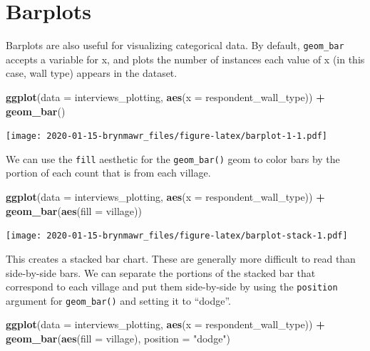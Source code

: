 \documentclass[]{book}
\newenvironment{Shaded}{\begin{snugshade}}{\end{snugshade}}
\newcommand{\KeywordTok}[1]{\textcolor[rgb]{0.13,0.29,0.53}{\textbf{#1}}}
\newcommand{\DataTypeTok}[1]{\textcolor[rgb]{0.13,0.29,0.53}{#1}}
\newcommand{\StringTok}[1]{\textcolor[rgb]{0.31,0.60,0.02}{#1}}
\newcommand{\OperatorTok}[1]{\textcolor[rgb]{0.81,0.36,0.00}{\textbf{#1}}}
\newcommand{\NormalTok}[1]{#1}
\begin{document}
\section{Barplots}\label{barplots}

Barplots are also useful for visualizing categorical data. By default,
\texttt{geom\_bar} accepts a variable for x, and plots the number of
instances each value of x (in this case, wall type) appears in the
dataset.

\begin{Shaded}
\begin{Highlighting}[]
\KeywordTok{ggplot}\NormalTok{(}\DataTypeTok{data =}\NormalTok{ interviews_plotting, }\KeywordTok{aes}\NormalTok{(}\DataTypeTok{x =}\NormalTok{ respondent_wall_type)) }\OperatorTok{+}
\StringTok{    }\KeywordTok{geom_bar}\NormalTok{()}
\end{Highlighting}
\end{Shaded}

\texttt{[image: 2020-01-15-brynmawr\_files/figure-latex/barplot-1-1.pdf]}

We can use the \texttt{fill} aesthetic for the \texttt{geom\_bar()} geom
to color bars by the portion of each count that is from each village.

\begin{Shaded}
\begin{Highlighting}[]
\KeywordTok{ggplot}\NormalTok{(}\DataTypeTok{data =}\NormalTok{ interviews_plotting, }\KeywordTok{aes}\NormalTok{(}\DataTypeTok{x =}\NormalTok{ respondent_wall_type)) }\OperatorTok{+}
\StringTok{    }\KeywordTok{geom_bar}\NormalTok{(}\KeywordTok{aes}\NormalTok{(}\DataTypeTok{fill =}\NormalTok{ village))}
\end{Highlighting}
\end{Shaded}

\texttt{[image: 2020-01-15-brynmawr\_files/figure-latex/barplot-stack-1.pdf]}

This creates a stacked bar chart. These are generally more difficult to
read than side-by-side bars. We can separate the portions of the stacked
bar that correspond to each village and put them side-by-side by using
the \texttt{position} argument for \texttt{geom\_bar()} and setting it
to ``dodge''.

\begin{Shaded}
\begin{Highlighting}[]
\KeywordTok{ggplot}\NormalTok{(}\DataTypeTok{data =}\NormalTok{ interviews_plotting, }\KeywordTok{aes}\NormalTok{(}\DataTypeTok{x =}\NormalTok{ respondent_wall_type)) }\OperatorTok{+}
\StringTok{    }\KeywordTok{geom_bar}\NormalTok{(}\KeywordTok{aes}\NormalTok{(}\DataTypeTok{fill =}\NormalTok{ village), }\DataTypeTok{position =} \StringTok{"dodge"}\NormalTok{)}
\end{Highlighting}
\end{Shaded}
\end{document}
